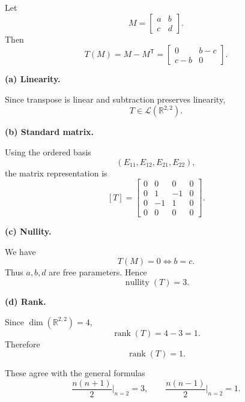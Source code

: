 \documentclass[12pt]{article}
\DeclareMathOperator{\rank}{rank}
\DeclareMathOperator{\nullity}{nullity}
\begin{document}
Let
\[
M=
\begin{bmatrix}
a & b\\
c & d
\end{bmatrix}.
\]
Then
\[
T(M)
=
M-M^{\mathsf T}
=
\begin{bmatrix}
0 & b-c\\
c-b & 0
\end{bmatrix}.
\]

\medskip
\noindent
\textbf{(a) Linearity.}

Since transpose is linear and subtraction preserves linearity,
\[
\boxed{T\in \mathcal L(\mathbb R^{2,2})}.
\]

\medskip
\noindent
\textbf{(b) Standard matrix.}

Using the ordered basis
\[
(E_{11},E_{12},E_{21},E_{22}),
\]
the matrix representation is
\[
\boxed{
[T]=
\begin{bmatrix}
0&0&0&0\\
0&1&-1&0\\
0&-1&1&0\\
0&0&0&0
\end{bmatrix}
}.
\]

\medskip
\noindent
\textbf{(c) Nullity.}

We have
\[
T(M)=0
\iff
b=c.
\]
Thus $a,b,d$ are free parameters.
Hence
\[
\boxed{\nullity(T)=3}.
\]

\medskip
\noindent
\textbf{(d) Rank.}

Since $\dim(\mathbb R^{2,2})=4$,
\[
\rank(T)=4-3=1.
\]
Therefore
\[
\boxed{\rank(T)=1}.
\]

\medskip
\noindent
These agree with the general formulas
\[
\frac{n(n+1)}{2}\Big|_{n=2}=3,
\qquad
\frac{n(n-1)}{2}\Big|_{n=2}=1.
\]
\end{document}
